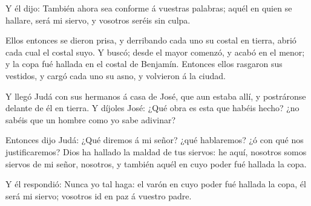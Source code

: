  Y él dijo: También ahora sea conforme á vuestras palabras;
aquél en quien se hallare, será mi siervo, y vosotros seréis sin culpa.

 Ellos entonces se dieron prisa, y derribando cada uno su
costal en tierra, abrió cada cual el costal suyo.  Y buscó;
desde el mayor comenzó, y acabó en el menor; y la copa fué hallada en el
costal de Benjamín.  Entonces ellos rasgaron sus vestidos,
y cargó cada uno su asno, y volvieron á la ciudad.

 Y llegó Judá con sus hermanos á casa de José, que aun
estaba allí, y postráronse delante de él en tierra.  Y
díjoles José: ¿Qué obra es esta que habéis hecho? ¿no sabéis que un
hombre como yo sabe adivinar?

 Entonces dijo Judá: ¿Qué diremos á mi señor? ¿qué
hablaremos? ¿ó con qué nos justificaremos? Dios ha hallado la maldad de
tus siervos: he aquí, nosotros somos siervos de mi señor, nosotros, y
también aquél en cuyo poder fué hallada la copa.

 Y él respondió: Nunca yo tal haga: el varón en cuyo poder
fué hallada la copa, él será mi siervo; vosotros id en paz á vuestro
padre.

